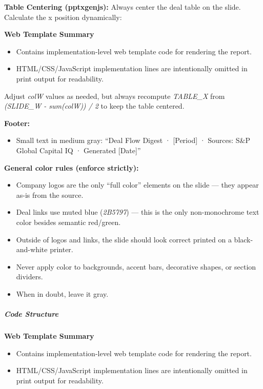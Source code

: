 \documentclass[11pt]{article}
\begin{document}
\textbf{Table Centering (pptxgenjs):} Always center the deal table on the slide. Calculate the x position dynamically:

\textbf{Web Template Summary}
\begin{itemize}[leftmargin=*,itemsep=2pt,topsep=2pt]
\item {} Contains implementation-level web template code for rendering the report.
\item {} HTML/CSS/JavaScript implementation lines are intentionally omitted in print output for readability.
\end{itemize}
Adjust \emph{colW} values as needed, but always recompute \emph{TABLE\_\allowbreak{}X} from \emph{(SLIDE\_\allowbreak{}W - sum(colW)) / 2} to keep the table centered.


\textbf{Footer:}

\begin{itemize}[leftmargin=*,itemsep=2pt,topsep=2pt]
\item {} Small text in medium gray: ``Deal Flow Digest · [Period] · Sources: S\&P Global Capital IQ · Generated [Date]''
\end{itemize}

\textbf{General color rules (enforce strictly):}

\begin{itemize}[leftmargin=*,itemsep=2pt,topsep=2pt]
\item {} Company logos are the only ``full color'' elements on the slide — they appear as-is from the source.
\item {} Deal links use muted blue (\emph{2B5797}) — this is the only non-monochrome text color besides semantic red/green.
\item {} Outside of logos and links, the slide should look correct printed on a black-and-white printer.
\item {} Never apply color to backgrounds, accent bars, decorative shapes, or section dividers.
\item {} When in doubt, leave it gray.
\end{itemize}

\subparagraph{Code Structure}\mbox{}\par

\textbf{Web Template Summary}
\begin{itemize}[leftmargin=*,itemsep=2pt,topsep=2pt]
\item {} Contains implementation-level web template code for rendering the report.
\item {} HTML/CSS/JavaScript implementation lines are intentionally omitted in print output for readability.
\end{itemize}
\end{document}
